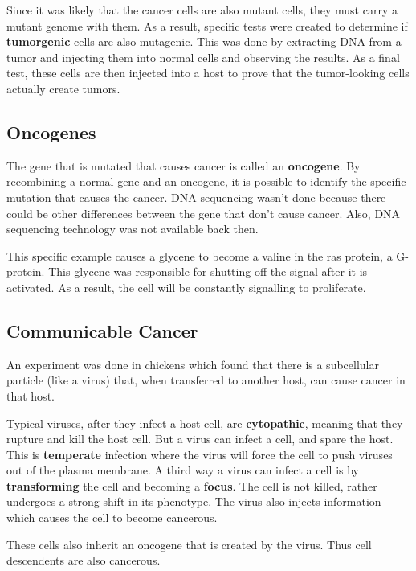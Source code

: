 \documentclass{article}
\begin{document}
Since it was likely that the cancer cells are also mutant cells, they must carry
a mutant genome with them. As a result, specific tests were created to
determine if \textbf{tumorgenic} cells are also mutagenic. This was done by
extracting DNA from a tumor and injecting them into normal cells and observing
the results. As a final test, these cells are then injected into a host to prove
that the tumor-looking cells actually create tumors.

\subsection{Oncogenes}

The gene that is mutated that causes cancer is called an \textbf{oncogene}. By
recombining a normal gene and an oncogene, it is possible to identify the
specific mutation that causes the cancer. DNA sequencing wasn't done because
there could be other differences between the gene that don't cause cancer. Also,
DNA sequencing technology was not available back then.

This specific example causes a glycene to become a valine in the ras protein, a
G-protein. This glycene was responsible for shutting off the signal after it is
activated. As a result, the cell will be constantly signalling to proliferate.

\subsection{Communicable Cancer}

An experiment was done in chickens which found that there is a subcellular
particle (like a virus) that, when transferred to another host, can cause cancer
in that host. 

Typical viruses, after they infect a host cell, are \textbf{cytopathic}, meaning
that they rupture and kill the host cell. But a virus can infect a cell, and
spare the host. This is \textbf{temperate} infection where the virus will force
the cell to push viruses out of the plasma membrane. A third way a virus can
infect a cell is by \textbf{transforming} the cell and becoming a
\textbf{focus}. The cell is not killed, rather undergoes a strong shift in its
phenotype. The virus also injects information which causes the cell to become
cancerous. 

These cells also inherit an oncogene that is created by the virus. Thus cell
descendents are also cancerous.
\end{document}
